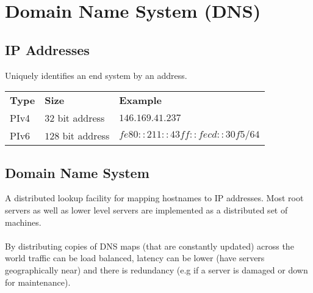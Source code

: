 \documentclass{report}
\begin{document}
\section*{Domain Name System (DNS)}
\subsection*{IP Addresses}
Uniquely identifies an end system by an address.
\begin{center}
	\begin{tabular}{l l l}
		\textbf{Type} & \textbf{Size}     & \textbf{Example}                 \\
		PIv4          & $32$ bit address  & $146.169.41.237$                 \\
		PIv6          & $128$ bit address & $fe80::211::43ff::fecd::30f5/64$ \\
	\end{tabular}
\end{center}
\subsection*{Domain Name System}
A distributed lookup facility for mapping hostnames to IP addresses.
Most root servers as well as lower level servers are implemented as a distributed set of machines.
\\
\\ By distributing copies of DNS maps (that are constantly updated) across the world traffic can be load balanced, latency can be lower (have servers geographically near) and there is redundancy (e.g if a server is damaged or down for maintenance).
\end{document}
